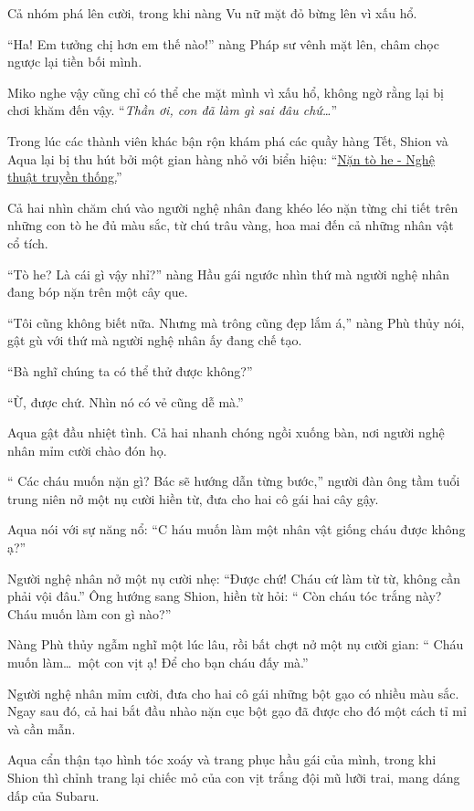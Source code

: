 \documentclass[../main.tex]{subfiles}
\begin{document}
Cả nhóm phá lên cười, trong khi nàng Vu nữ mặt đỏ bừng lên vì xấu hổ.

``Ha! Em tưởng chị hơn em thế nào!'' nàng Pháp sư vênh mặt lên, châm chọc ngược lại tiền bối mình.

Miko nghe vậy cũng chỉ có thể che mặt mình vì xấu hổ, không ngờ rằng lại bị chơi khăm đến vậy. ``\textit{Thần ơi, con đã làm gì sai đâu chứ\dots}''

\ct

Trong lúc các thành viên khác bận rộn khám phá các quầy hàng Tết, Shion và Aqua lại bị thu hút bởi một gian hàng nhỏ với biển hiệu: ``\uline{Nặn tò he - Nghệ thuật truyền thống.}''

Cả hai nhìn chăm chú vào người nghệ nhân đang khéo léo nặn từng chi tiết trên những con tò he đủ màu sắc, từ chú trâu vàng, hoa mai đến cả những nhân vật cổ tích.

``Tò he? Là cái gì vậy nhỉ?'' nàng Hầu gái ngước nhìn thứ mà người nghệ nhân đang bóp nặn trên một cây que.

``Tôi cũng không biết nữa. Nhưng mà trông cũng đẹp lắm á,'' nàng Phù thủy nói, gật gù với thứ mà người nghệ nhân ấy đang chế tạo.

``Bà nghĩ chúng ta có thể thử được không?''

``Ừ, được chứ. Nhìn nó có vẻ cũng dễ mà.''

Aqua gật đầu nhiệt tình. Cả hai nhanh chóng ngồi xuống bàn, nơi người nghệ nhân mỉm cười chào đón họ.

``{\color{red} Các cháu muốn nặn gì? Bác sẽ hướng dẫn từng bước,}'' người đàn ông tầm tuổi trung niên nở một nụ cười hiền từ, đưa cho hai cô gái hai cây gậy.

Aqua nói với sự năng nổ: ``C{\color{red} háu muốn làm một nhân vật giống cháu được không ạ?}''

Người nghệ nhân nở một nụ cười nhẹ: ``Được chứ! Cháu cứ làm từ từ, không cần phải vội đâu.'' Ông hướng sang Shion, hiền từ hỏi: ``{\color{red} Còn cháu tóc trắng này? Cháu muốn làm con gì nào?}''

Nàng Phù thủy ngẫm nghĩ một lúc lâu, rồi bất chợt nở một nụ cười gian: ``{\color{red} Cháu muốn làm\dots\ một con vịt ạ! Để cho bạn cháu đấy mà.}''

Người nghệ nhân mỉm cười, đưa cho hai cô gái những bột gạo có nhiều màu sắc. Ngay sau đó, cả hai bắt đầu nhào nặn cục bột gạo đã được cho đó một cách tỉ mỉ và cần mẫn.

Aqua cẩn thận tạo hình tóc xoáy và trang phục hầu gái của mình, trong khi Shion thì chỉnh trang lại chiếc mỏ của con vịt trắng đội mũ lưỡi trai, mang dáng dấp của Subaru.
\end{document}
